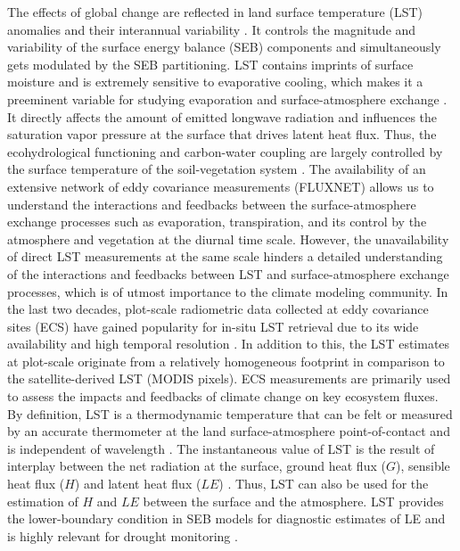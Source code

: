 \documentclass[fleqn,10pt]{wlscirep}
\begin{document}
The effects of global change are reflected in land surface temperature (LST) anomalies and their interannual variability \cite{rowell2005scenario}. It controls the magnitude and variability of the surface energy balance (SEB) components and simultaneously gets modulated by the SEB partitioning\cite{mallick2015reintroducing,timmermans2007intercomparison}. LST contains imprints of surface moisture and is extremely sensitive to evaporative cooling, which makes it a preeminent variable for studying evaporation and surface-atmosphere exchange \cite{mallick2018critical,trebs2021role,kustas2009advances}. It directly affects the amount of emitted longwave radiation and influences the saturation vapor pressure at the surface that drives latent heat flux. Thus, the ecohydrological functioning and carbon-water coupling are largely controlled by the surface temperature of the soil-vegetation system \cite{still2021imaging}.
 The availability of an extensive network of eddy covariance measurements (FLUXNET) allows us to understand the interactions and feedbacks between the surface-atmosphere exchange processes such as evaporation, transpiration, and its control by the atmosphere and vegetation at the diurnal time scale. However, the unavailability of direct LST measurements at the same scale hinders a detailed understanding of the interactions and feedbacks between LST and surface-atmosphere exchange processes, which is of utmost importance to the climate modeling community. %
 In the last two decades, plot-scale radiometric data collected at eddy covariance sites (ECS) have gained popularity for in-situ LST retrieval due to its wide availability and high temporal resolution \cite{stoy2013data,cullen2007energy}. In addition to this, the LST estimates at plot-scale originate from a relatively homogeneous footprint in comparison to the satellite-derived LST (MODIS pixels). ECS measurements are primarily used to assess the impacts and feedbacks of climate change on key ecosystem fluxes\cite{baldocchi2001fluxnet}. 
 By definition, LST is a thermodynamic temperature that can be felt or measured by an accurate thermometer at the land surface-atmosphere point-of-contact and is independent of wavelength \cite{guillevic2017land}. The instantaneous value of LST is the result of interplay between the net radiation at the surface, ground heat flux ($G$), sensible heat flux ($H$) and latent heat flux ($LE$) \cite{wang_global_2013-2}. Thus, LST can also be used for the estimation of $H$ \cite{sun1995relationship} and $LE$ \cite{jacob2001comprehensive} between the surface and the atmosphere. LST provides the lower-boundary condition in SEB models for diagnostic estimates of LE  and is highly relevant for drought monitoring \cite{trebs2021role,mallick2016canopy,mallick2015reintroducing}. %
\end{document}
